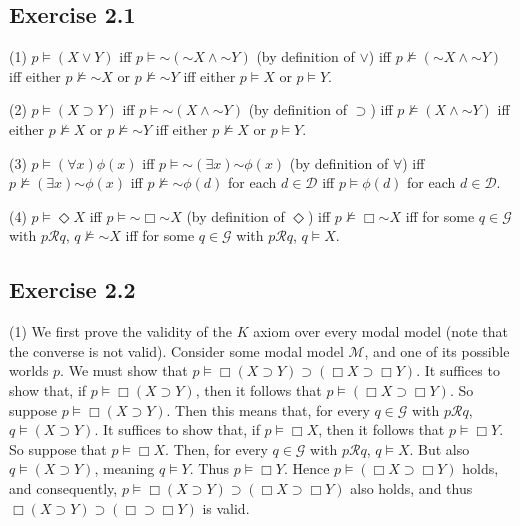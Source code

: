 \documentclass{article}
\newcommand*{\oldneg}{\mathord{\sim}}
\theoremstyle{definition}
\begin{document}
\subsection*{Exercise 2.1}
(1) $p\vDash (X\vee Y)$ iff $p\vDash\oldneg(\oldneg X\wedge\oldneg Y)$ (by definition of $\vee$) iff 
$p\nvDash (\oldneg X\wedge\oldneg Y)$ iff either $p\nvDash \oldneg X$ or $p\nvDash \oldneg Y$ iff 
either $p\vDash X$ or $p\vDash Y$.

(2) $p\vDash (X\supset Y)$ iff $p\vDash\oldneg(X\wedge\oldneg Y)$ (by definition of $\supset$) iff 
$p\nvDash (X\wedge\oldneg Y)$ iff either $p\nvDash X$ or $p\nvDash\oldneg Y$ iff 
either $p\nvDash X$ or $p\vDash Y$.

(3) $p\vDash (\forall x)\phi(x)$ iff $p\vDash\oldneg(\exists x)\oldneg\phi(x)$ (by definition of $\forall$) iff 
$p\nvDash (\exists x)\oldneg\phi(x)$ iff $p\nvDash\oldneg\phi(d)$ for each $d\in\mathcal{D}$ iff 
$p\vDash\phi(d)$ for each $d\in\mathcal{D}$.

(4) $p\vDash \Diamond X$ iff $p\vDash\oldneg\Box\oldneg X$ (by definition of $\Diamond$) iff 
$p\nvDash\Box\oldneg X$ iff for some $q\in\mathcal{G}$ with $p\mathcal{R}q$, $q\nvDash\oldneg X$ iff 
for some $q\in\mathcal{G}$ with $p\mathcal{R}q$, $q\vDash X$.

\subsection*{Exercise 2.2}
(1) We first prove the validity of the $K$ axiom over every modal model (note that the converse is not valid). 
Consider some modal model $\mathcal{M}$, and one of its possible 
worlds $p$. We must show that $p\vDash \Box(X\supset Y)\supset (\Box X\supset\Box Y)$. It suffices to show that, if 
$p\vDash\Box(X\supset Y)$, then it follows that $p\vDash (\Box X\supset\Box Y)$. So suppose 
$p\vDash\Box(X\supset Y)$. Then this means that, for every $q\in\mathcal{G}$ with $p\mathcal{R}q$, $q\vDash (X\supset Y)$. It suffices to show that, 
if $p\vDash\Box X$, then it follows that $p\vDash\Box Y$. So suppose that $p\vDash\Box X$. Then, for every $q\in\mathcal{G}$ with 
$p\mathcal{R}q$, $q\vDash X$. But also $q\vDash (X\supset Y)$, meaning $q\vDash Y$. Thus $p\vDash\Box Y$. Hence $p\vDash (\Box X\supset\Box Y)$ holds, 
and consequently, $p\vDash\Box (X\supset Y)\supset (\Box X\supset\Box Y)$ also holds, and thus $\Box (X\supset Y)\supset (\Box\supset\Box Y)$ is valid.
\end{document}
